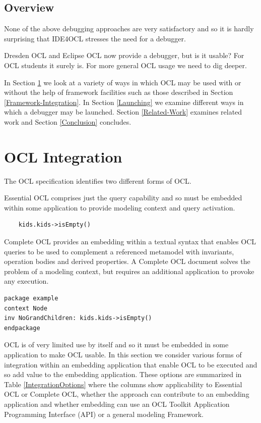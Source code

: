 \documentclass[a4paper]{article}
\begin{document}
\subsection{Overview}

None of the above debugging approaches are very satisfactory and so it is hardly surprising that IDE4OCL\cite{Chimiak-Opaka} stresses the need for a debugger.

Dresden OCL\cite{DresdenOCL-Debug} and Eclipse OCL now provide a debugger, but is it usable? For OCL students it surely is. For more general OCL usage we need to dig deeper.

In Section  \ref{OCL-Integration} we look at a variety of ways in which OCL may be used with or without the help of framework facilities such as those described in Section \ref{Framework-Integration}. In Section \ref{Launching} we examine different ways in which a debugger may be launched.  Section \ref{Related-Work} examines related work and Section \ref{Conclusion} concludes.

\section{OCL Integration}\label{OCL-Integration}

The OCL specification identifies two different forms of OCL.

Essential OCL comprises just the query capability and so must be embedded within some application to provide modeling context and query activation.

\begin{verbatim}
    kids.kids->isEmpty()
\end{verbatim}

Complete OCL provides an embedding within a textual syntax that enables OCL queries to be used to complement a referenced metamodel with invariants, operation bodies and derived properties. A Complete OCL document solves the problem of a modeling context, but requires an additional application to provoke any execution.

\begin{verbatim}
package example
context Node
inv NoGrandChildren: kids.kids->isEmpty()
endpackage
\end{verbatim}

OCL is of very limited use by itself and so it must be embedded in some application to make OCL usable. In this section we consider various forms of integration within an embedding application that enable OCL to be executed and so add value to the embedding application. These options are summarized in Table \ref{IntegrationOptions} where the columns show applicability to Essential OCL or Complete OCL, whether the approach can contribute to an embedding application and whether embedding can use an OCL Toolkit Application Programming Interface (API) or a general modeling Framework.
\end{document}

